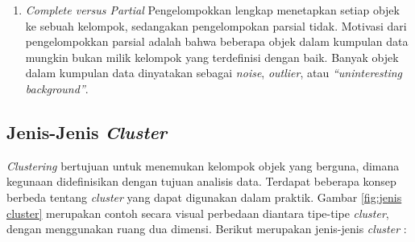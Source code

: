 \begin{enumerate}
    \item \textit{Complete versus Partial}
        Pengelompokkan lengkap menetapkan setiap objek ke sebuah kelompok, sedangakan pengelompokan parsial tidak. Motivasi dari pengelompokkan parsial adalah bahwa beberapa objek dalam kumpulan data mungkin bukan milik kelompok yang terdefinisi dengan baik. Banyak objek dalam kumpulan data dinyatakan sebagai \textit{noise}, \textit{outlier}, atau \textit{“uninteresting background”}.
    
\end{enumerate}


\subsection{Jenis-Jenis \textit{Cluster}}
\label{subsec:jeni cluster}
\textit{Clustering} bertujuan untuk menemukan kelompok objek yang berguna, dimana kegunaan didefinisikan dengan tujuan analisis data. Terdapat beberapa konsep berbeda tentang \textit{cluster} yang dapat digunakan dalam praktik. Gambar \ref{fig:jenis cluster} merupakan contoh secara visual perbedaan diantara tipe-tipe \textit{cluster}, dengan menggunakan ruang dua dimensi. Berikut merupakan jenis-jenis \textit{cluster} \cite{buku:data:mining} :

